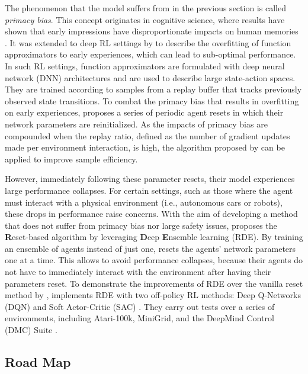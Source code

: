 \documentclass[base]{subfiles}
\begin{document}
The phenomenon that the model suffers from in the previous section is called \textit{primacy bias}.
This concept originates in cognitive science, where results have shown that early impressions have disproportionate impacts on human memories \cite{cogsci}.
It was extended to deep RL settings by \cite{nikishin2022} to describe the overfitting of function approximators to early experiences, which can lead to sub-optimal performance.
In such RL settings, function approximators are formulated with deep neural network (DNN) architectures and are used to describe large state-action spaces.
They are trained according to samples from a replay buffer that tracks previously observed state transitions.
To combat the primacy bias that results in overfitting on early experiences, \cite{nikishin2022} proposes a series of periodic agent resets in which their network parameters are reinitialized.
As the impacts of primacy bias are compounded when the replay ratio, defined as the number of gradient updates made per environment interaction, is high, the algorithm proposed by \cite{nikishin2022} can be applied to improve sample efficiency.

However, immediately following these parameter resets, their model experiences large performance collapses.
For certain settings, such as those where the agent must interact with a physical environment (i.e., autonomous cars or robots), these drops in performance raise concerns.
With the aim of developing a method that does not suffer from primacy bias nor large safety issues, \cite{kim2023} proposes the \textbf{R}eset-based algorithm by leveraging \textbf{D}eep \textbf{E}nsemble learning (RDE).
By training an ensemble of agents instead of just one, \cite{kim2023} resets the agents' network parameters one at a time.
This allows \cite{kim2023} to avoid performance collapses, because their agents do not have to immediately interact with the environment after having their parameters reset.
To demonstrate the improvements of RDE over the vanilla reset method by \cite{nikishin2022}, \cite{kim2023} implements RDE with two off-policy RL methods: Deep Q-Networks (DQN) and Soft Actor-Critic (SAC) \cite{minh2015, sac}.
They carry out tests over a series of environments, including Atari-100k, MiniGrid, and the DeepMind Control (DMC) Suite \cite{atari, minigrid, dmc}.

\subsection{Road Map}
\end{document}
